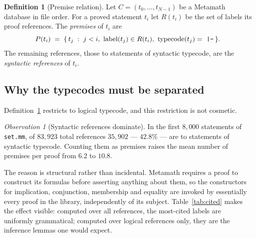 \documentclass[11pt]{article}
\theoremstyle{plain}
\theoremstyle{definition}
\newtheorem{definition}[theorem]{Definition}
\theoremstyle{remark}
\newtheorem{observation}[theorem]{Observation}
\begin{document}
\begin{definition}[Premise relation]\label{def:premise}
Let $C=(t_0,\dots,t_{N-1})$ be a Metamath database in file order. For a proved
statement $t_i$ let $R(t_i)$ be the set of labels its proof references. The
\emph{premises} of $t_i$ are
\[
P(t_i)\;=\;\{\,t_j \;:\; j<i,\ \text{label}(t_j)\in R(t_i),\ \text{typecode}(t_j)=\ \text{\texttt{|-}}\,\}.
\]
The remaining references, those to statements of syntactic typecode, are the
\emph{syntactic references} of $t_i$.
\end{definition}

\subsection{Why the typecodes must be separated}

Definition~\ref{def:premise} restricts to logical typecode, and this restriction
is not cosmetic.

\begin{observation}[Syntactic references dominate]\label{obs:syntax}
In the first $8{,}000$ statements of \texttt{set.mm}, of $83{,}923$ total
references $35{,}902$ --- $42.8\%$ --- are to statements of syntactic typecode.
Counting them as premises raises the mean number of premises per proof from
$6.2$ to $10.8$.
\end{observation}

The reason is structural rather than incidental. Metamath requires a proof to
construct its formulas before asserting anything about them, so the constructors
for implication, conjunction, membership and equality are invoked by essentially
every proof in the library, independently of its subject. Table~\ref{tab:cited}
makes the effect visible: computed over all references, the most-cited labels are
uniformly grammatical; computed over logical references only, they are the
inference lemmas one would expect.
\end{document}
